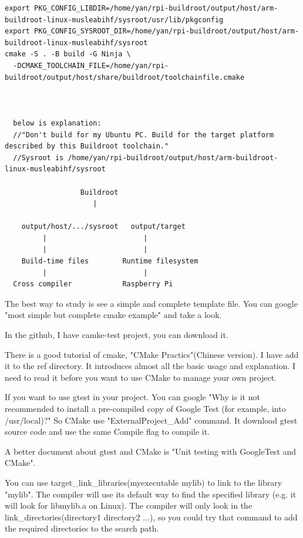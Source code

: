 \documentclass[paper=8.5in:11in, twoside, 12pt, pagesize=pdftex]{book}
\begin{document}
\begin{lstlisting}
export PKG_CONFIG_LIBDIR=/home/yan/rpi-buildroot/output/host/arm-buildroot-linux-musleabihf/sysroot/usr/lib/pkgconfig
export PKG_CONFIG_SYSROOT_DIR=/home/yan/rpi-buildroot/output/host/arm-buildroot-linux-musleabihf/sysroot
cmake -S . -B build -G Ninja \
  -DCMAKE_TOOLCHAIN_FILE=/home/yan/rpi-buildroot/output/host/share/buildroot/toolchainfile.cmake
  
  
  
  below is explanation:
  //"Don't build for my Ubuntu PC. Build for the target platform described by this Buildroot toolchain."
  //Sysroot is /home/yan/rpi-buildroot/output/host/arm-buildroot-linux-musleabihf/sysroot
  
                  Buildroot
                     |
   
    output/host/.../sysroot   output/target
         |                       |
         |                       |
    Build-time files        Runtime filesystem
         |                       |
  Cross compiler            Raspberry Pi
\end{lstlisting}



	The best way to study is see a simple and complete template file. You can google "most simple but complete cmake example" and take a look.  
		
	In the github, I have camke-test project, you can download it.
		
	There is a good tutorial of cmake, "CMake Practics"(Chinese version). I have add it to the ref directory. It introduces almost all the basic usage and explanation. I need to read it before you want to use CMake to manage your own project.
		
	If you want to use gtest in your project. You can google "Why is it not recommended to install a pre-compiled copy of Google Test (for example, into /usr/local)?" So CMake use "ExternalProject\_Add" command. It download gtest source code and use the same Compile flag to compile it. 
		
	A better document about gtest and CMake is "Unit testing with GoogleTest and CMake". 
		
	You can use target\_link\_libraries(myexecutable mylib) to link to the library "mylib". The compiler will use its default way to find the specified library (e.g. it will look for libmylib.a on Linux). The compiler will only look in the link\_directories(directory1 directory2 ...), so you could try that command to add the required directories to the search path.
\end{document}
